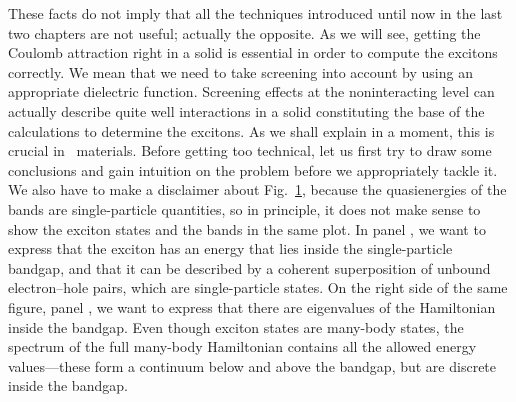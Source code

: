 These facts do not imply that all the techniques introduced until now in the last two chapters are not useful; actually the opposite.
As we will see, getting the Coulomb attraction right in a solid is essential in order to compute the excitons correctly.
We mean that we need to take screening into account by using an appropriate dielectric function.
Screening effects at the noninteracting level can actually describe quite well interactions in a solid constituting the base of the calculations to determine the excitons.
As we shall explain in a moment, this is crucial in \bd~materials.
Before getting too technical, let us first try to draw some conclusions and gain intuition on the problem before we appropriately tackle it.
We also have to make a disclaimer about Fig.~\ref{fig:electron_hole_pair_formation}, because the quasienergies of the bands are single-particle quantities, so in principle, it does not make sense to show the exciton states and the bands in the same plot.
In panel , we want to express that the exciton has an energy that lies inside the single-particle bandgap, and that it can be described by a coherent superposition of unbound electron--hole pairs, which are single-particle states.
On the right side of the same figure, panel , we want to express that there are eigenvalues of the Hamiltonian inside the bandgap.
Even though exciton states are many-body states, the spectrum of the full many-body Hamiltonian contains all the allowed energy values---these form a continuum below and above the bandgap, but are discrete inside the bandgap.

\begin{figure}[t]
    \centerfloat
    
    \label{fig:electron_hole_pair_formation}
\end{figure}

